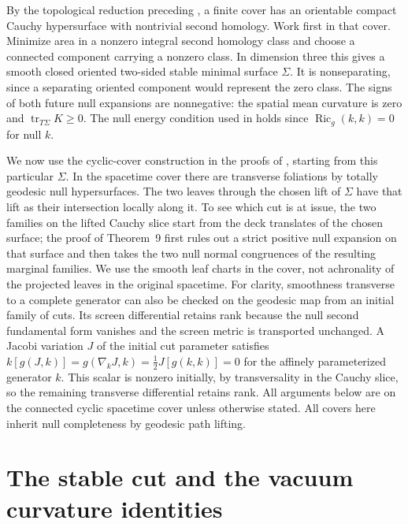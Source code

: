 \documentclass[11pt]{article}
\DeclareMathOperator{\Ric}{Ric}
\begin{document}
By the topological reduction preceding \cite[Theorem~5]{GLcos},
a finite cover has an orientable compact Cauchy hypersurface with
nontrivial second homology. Work first in that cover. Minimize area in
a nonzero integral second homology class and choose a connected
component carrying a nonzero class. In dimension three this gives a
smooth closed oriented two-sided stable minimal surface $\Sigma$.
It is nonseparating, since a separating oriented component would
represent the zero class. The signs of both future null expansions
are nonnegative: the spatial mean curvature is zero and
$\operatorname{tr}_{T\Sigma}K\geq0$. The null energy condition used
in \cite{GLcos,GLpen} holds since $\Ric_g(k,k)=0$ for null $k$.

We now use the cyclic-cover construction in the proofs of
\cite[Theorems~8--9]{GLpen}, starting from this particular $\Sigma$.
In the spacetime cover there are transverse foliations by totally
geodesic null hypersurfaces. The two leaves through the chosen
lift of $\Sigma$ have that lift as their intersection locally along
it. To see which cut is at issue, the two families on the lifted
Cauchy slice start from the deck translates of the chosen surface;
the proof of Theorem~9 first rules out a strict positive null
expansion on that surface and then takes the two null normal
congruences of the resulting marginal families. We use the smooth
leaf charts in the cover, not achronality of the projected leaves
in the original spacetime. For clarity, smoothness transverse to a
complete generator can also be checked on the geodesic map from an
initial family of cuts. Its screen differential retains rank because
the null second fundamental form vanishes and the screen metric is
transported unchanged. A Jacobi variation $J$ of the initial cut
parameter satisfies
$k[g(J,k)]=g(\nabla_k J,k)=\tfrac12 J[g(k,k)]=0$
for the affinely parameterized generator $k$. This scalar is nonzero
initially, by transversality in the Cauchy slice, so the remaining
transverse differential retains rank. All arguments below are on the
connected cyclic spacetime cover unless otherwise stated. All covers
here inherit null completeness by geodesic path lifting.

\section{The stable cut and the vacuum curvature identities}
\end{document}
